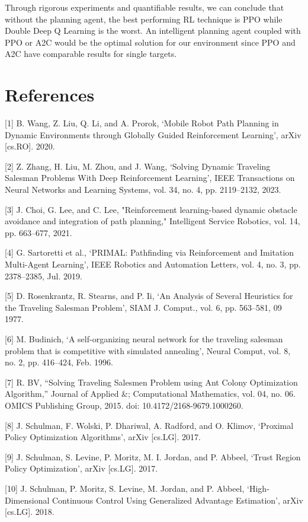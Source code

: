 \documentclass{article}
\begin{document}
	Through rigorous experiments and quantifiable results, we can conclude that without the planning agent, the best performing RL technique is PPO while Double Deep Q Learning is the worst. An intelligent planning agent coupled with PPO or A2C would be the optimal solution for our environment since PPO and A2C have comparable results for single targets.
	
	\section*{References}
	
	[1] B. Wang, Z. Liu, Q. Li, and A. Prorok, ‘Mobile Robot Path Planning in Dynamic Environments through Globally Guided Reinforcement Learning’, arXiv [cs.RO]. 2020.
	
	[2] Z. Zhang, H. Liu, M. Zhou, and J. Wang, ‘Solving Dynamic Traveling Salesman Problems With Deep Reinforcement Learning’, IEEE Transactions on Neural Networks and Learning Systems, vol. 34, no. 4, pp. 2119–2132, 2023.
	
	[3] J. Choi, G. Lee, and C. Lee, "Reinforcement learning-based dynamic obstacle avoidance and integration of path planning," Intelligent Service Robotics, vol. 14, pp. 663–677, 2021. 
		
	[4] G. Sartoretti et al., ‘PRIMAL: Pathfinding via Reinforcement and Imitation Multi-Agent Learning’, IEEE Robotics and Automation Letters, vol. 4, no. 3, pp. 2378–2385, Jul. 2019.
	
	[5] D. Rosenkrantz, R. Stearns, and P. Ii, ‘An Analysis of Several Heuristics for the Traveling Salesman Problem’, SIAM J. Comput., vol. 6, pp. 563–581, 09 1977.
	
	[6] M. Budinich, ‘A self-organizing neural network for the traveling salesman problem that is competitive with simulated annealing’, Neural Comput, vol. 8, no. 2, pp. 416–424, Feb. 1996.
	
	[7] R. BV, “Solving Traveling Salesmen Problem using Ant Colony Optimization Algorithm,” Journal of Applied \&; Computational Mathematics, vol. 04, no. 06. OMICS Publishing Group, 2015. doi: 10.4172/2168-9679.1000260.
	
	[8] J. Schulman, F. Wolski, P. Dhariwal, A. Radford, and O. Klimov, ‘Proximal Policy Optimization Algorithms’, arXiv [cs.LG]. 2017.
	
	[9] J. Schulman, S. Levine, P. Moritz, M. I. Jordan, and P. Abbeel, ‘Trust Region Policy Optimization’, arXiv [cs.LG]. 2017.
	
	[10] J. Schulman, P. Moritz, S. Levine, M. Jordan, and P. Abbeel, ‘High-Dimensional Continuous Control Using Generalized Advantage Estimation’, arXiv [cs.LG]. 2018.
	
\end{document}
